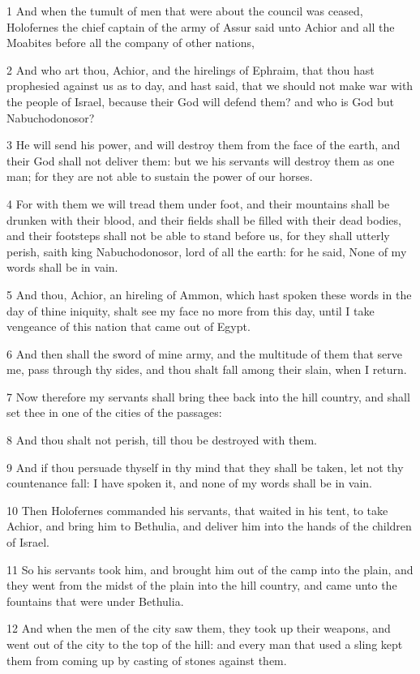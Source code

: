 \par 1 And when the tumult of men that were about the council was ceased, Holofernes the chief captain of the army of Assur said unto Achior and all the Moabites before all the company of other nations,
\par 2 And who art thou, Achior, and the hirelings of Ephraim, that thou hast prophesied against us as to day, and hast said, that we should not make war with the people of Israel, because their God will defend them? and who is God but Nabuchodonosor?
\par 3 He will send his power, and will destroy them from the face of the earth, and their God shall not deliver them: but we his servants will destroy them as one man; for they are not able to sustain the power of our horses.
\par 4 For with them we will tread them under foot, and their mountains shall be drunken with their blood, and their fields shall be filled with their dead bodies, and their footsteps shall not be able to stand before us, for they shall utterly perish, saith king Nabuchodonosor, lord of all the earth: for he said, None of my words shall be in vain.
\par 5 And thou, Achior, an hireling of Ammon, which hast spoken these words in the day of thine iniquity, shalt see my face no more from this day, until I take vengeance of this nation that came out of Egypt.
\par 6 And then shall the sword of mine army, and the multitude of them that serve me, pass through thy sides, and thou shalt fall among their slain, when I return.
\par 7 Now therefore my servants shall bring thee back into the hill country, and shall set thee in one of the cities of the passages:
\par 8 And thou shalt not perish, till thou be destroyed with them.
\par 9 And if thou persuade thyself in thy mind that they shall be taken, let not thy countenance fall: I have spoken it, and none of my words shall be in vain.
\par 10 Then Holofernes commanded his servants, that waited in his tent, to take Achior, and bring him to Bethulia, and deliver him into the hands of the children of Israel.
\par 11 So his servants took him, and brought him out of the camp into the plain, and they went from the midst of the plain into the hill country, and came unto the fountains that were under Bethulia.
\par 12 And when the men of the city saw them, they took up their weapons, and went out of the city to the top of the hill: and every man that used a sling kept them from coming up by casting of stones against them.
